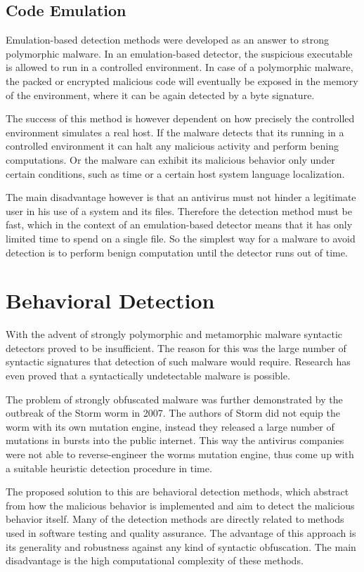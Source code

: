 \subsection{Code Emulation}
Emulation-based detection methods were developed as an answer to strong polymorphic malware. In an emulation-based detector, the suspicious executable is allowed to run in a controlled environment. In case of a polymorphic malware, the packed or encrypted malicious code will eventually be exposed in the memory of the environment, where it can be again detected by a byte signature.

The success of this method is however dependent on how precisely the controlled environment simulates a real host. If the malware detects that its running in a controlled environment it can halt any malicious activity and perform bening computations. Or the malware can exhibit its malicious behavior only under certain conditions, such as time or a certain host system language localization.

The main disadvantage however is that an antivirus must not hinder a legitimate user in his use of a system and its files. Therefore the detection method must be fast, which in the context of an emulation-based detector means that it has only limited time to spend on a single file. So the simplest way for a malware to avoid detection is to perform benign computation until the detector runs out of time.

\section{Behavioral Detection}
With the advent of strongly polymorphic and metamorphic malware syntactic detectors proved to be insufficient. The reason for this was the large number of syntactic signatures that detection of such malware would require. Research has even proved that a syntactically undetectable malware is possible\cite{Filiol07}. 

The problem of strongly obfuscated malware was further demonstrated by the outbreak of the Storm worm in 2007. The authors of Storm did not equip the worm with its own mutation engine, instead they released a large number of mutations in bursts into the public internet. This way the antivirus companies were not able to reverse-engineer the worms mutation engine, thus come up with a suitable heuristic detection procedure in time.

The proposed solution to this are behavioral detection methods, which abstract from how the malicious behavior is implemented and aim to detect the malicious behavior itself. Many of the detection methods are directly related to methods used in software testing and quality assurance. The advantage of this approach is its generality and robustness against any kind of syntactic obfuscation. The main disadvantage is the high computational complexity of these methods. 


